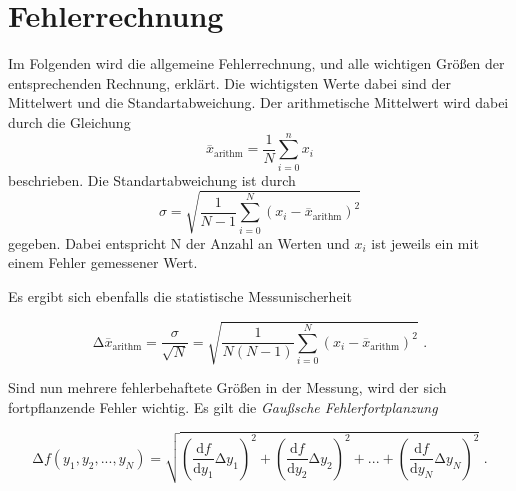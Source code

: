\section{Fehlerrechnung}
\label{sec:Fehlerrechnung}


Im Folgenden wird die allgemeine Fehlerrechnung, und alle wichtigen Größen der entsprechenden Rechnung, erklärt.
Die wichtigsten Werte dabei sind der Mittelwert und die Standartabweichung.
Der arithmetische Mittelwert wird dabei durch die Gleichung
\begin{equation}
    \stackrel{_{-}}{x}_{\text{arithm}}  = \frac{1}{N} \sum_{i=0}^{n} x_i
\end{equation}
beschrieben.
Die Standartabweichung ist durch
\begin{equation}
    \sigma  = \sqrt{\frac{1}{N - 1 } \sum_{i=0}^{N} (x_i -  \stackrel{_{-}}{x}_{\text{arithm}})^2}
\end{equation}
gegeben. Dabei entspricht N der Anzahl an Werten und $x_i$ ist jeweils ein mit einem Fehler gemessener Wert.


Es ergibt sich ebenfalls die statistische Messunischerheit

\begin{equation}
    \increment \stackrel{_{-}}{x}_{\text{arithm}} = \frac{\sigma}{\sqrt{N}} = 
    \sqrt{\frac{1}{N(N - 1)} \sum_{i=0}^{N} (x_i -  \stackrel{_{-}}{x}_{\text{arithm}})^2} \text{ .}
\end{equation}

Sind nun mehrere fehlerbehaftete Größen in der Messung, wird der sich fortpflanzende Fehler wichtig.
Es gilt die \textit{Gaußsche Fehlerfortplanzung}

\begin{equation} \label{fehler:gauß}
    \increment f(y_1 ,y_2 ,...,y_N ) = \sqrt{\left(\frac{\text{d} f}{\text{d} y_{1}} \increment y_{1}\right)^2
    + \left(\frac{\text{d} f}{\text{d} y_{2}} \increment y_{2}\right)^2 + ... + 
    \left(\frac{\text{d} f}{\text{d} y_{N}} \increment y_{N}\right)^2
    } \text{ .}
\end{equation}